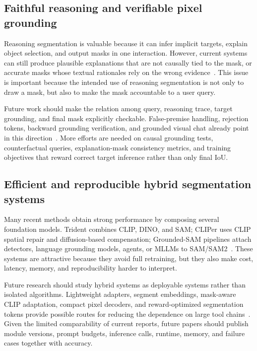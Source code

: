 \subsection{Faithful reasoning and verifiable pixel grounding}

Reasoning segmentation is valuable because it can infer implicit targets, explain object selection, and output masks in one interaction. However, current systems can still produce plausible explanations that are not causally tied to the mask, or accurate masks whose textual rationales rely on the wrong evidence~\citep{xlaiLisaReasoningSegmentation2024,renPixellmPixelReasoning2024,zhuLensLearningSegment2026,zhouReasoningImplicitSelfsupervised2026}. This issue is important because the intended use of reasoning segmentation is not only to draw a mask, but also to make the mask accountable to a user query.

Future work should make the relation among query, reasoning trace, target grounding, and final mask explicitly checkable. False-premise handling, rejection tokens, backward grounding verification, and grounded visual chat already point in this direction~\citep{xiaGsvaGeneralizedSegmentation2024,wuSeeSaySegment2024,zhangLlavagroundingGroundedVisual2024,guoSeeingBelievingRichContext2026}. More efforts are needed on causal grounding tests, counterfactual queries, explanation-mask consistency metrics, and training objectives that reward correct target inference rather than only final IoU.

\subsection{Efficient and reproducible hybrid segmentation systems}

Many recent methods obtain strong performance by composing several foundation models. Trident combines CLIP, DINO, and SAM; CLIPer uses CLIP spatial repair and diffusion-based compensation; Grounded-SAM pipelines attach detectors, language grounding models, agents, or MLLMs to SAM/SAM2~\citep{shiyHarnessingVisionFoundation2025,lsunCliperHierarchicallyImproving2025,liu2024groundingdino,luoConnectingDotsTrainingFree2026}. These systems are attractive because they avoid full retraining, but they also make cost, latency, memory, and reproducibility harder to interpret.

Future research should study hybrid systems as deployable systems rather than isolated algorithms. Lightweight adapters, segment embeddings, mask-aware CLIP adaptation, compact pixel decoders, and reward-optimized segmentation tokens provide possible routes for reducing the dependence on large tool chains~\citep{xu2023san,yliMaskadapterDevilMasks2025,xwangUseUniversalSegment2024,renPixellmPixelReasoning2024,huangSamr1LeveragingSam2026}. Given the limited comparability of current reports, future papers should publish module versions, prompt budgets, inference calls, runtime, memory, and failure cases together with accuracy.

